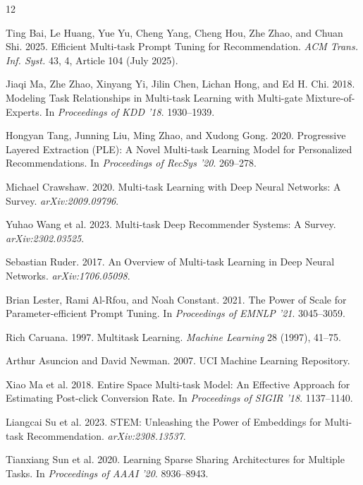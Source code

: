 \documentclass[sigconf,anonymous]{acmart}
\begin{document}
\begin{thebibliography}{12}

Ting Bai, Le Huang, Yue Yu, Cheng Yang, Cheng Hou, Zhe Zhao, and Chuan Shi.
2025. Efficient Multi-task Prompt Tuning for Recommendation.
\emph{ACM Trans. Inf. Syst.} 43, 4, Article 104 (July 2025).

Jiaqi Ma, Zhe Zhao, Xinyang Yi, Jilin Chen, Lichan Hong, and Ed H. Chi. 2018.
Modeling Task Relationships in Multi-task Learning with Multi-gate
Mixture-of-Experts. In \emph{Proceedings of KDD '18}. 1930--1939.

Hongyan Tang, Junning Liu, Ming Zhao, and Xudong Gong. 2020.
Progressive Layered Extraction (PLE): A Novel Multi-task Learning Model for
Personalized Recommendations. In \emph{Proceedings of RecSys '20}. 269--278.

Michael Crawshaw. 2020. Multi-task Learning with Deep Neural Networks: A Survey.
\emph{arXiv:2009.09796}.

Yuhao Wang et al. 2023. Multi-task Deep Recommender Systems: A Survey.
\emph{arXiv:2302.03525}.

Sebastian Ruder. 2017. An Overview of Multi-task Learning in Deep Neural
Networks. \emph{arXiv:1706.05098}.

Brian Lester, Rami Al-Rfou, and Noah Constant. 2021. The Power of Scale for
Parameter-efficient Prompt Tuning. In \emph{Proceedings of EMNLP '21}. 3045--3059.

Rich Caruana. 1997. Multitask Learning. \emph{Machine Learning} 28 (1997), 41--75.

Arthur Asuncion and David Newman. 2007. UCI Machine Learning Repository.

Xiao Ma et al. 2018. Entire Space Multi-task Model: An Effective Approach for
Estimating Post-click Conversion Rate. In \emph{Proceedings of SIGIR '18}. 1137--1140.

Liangcai Su et al. 2023. STEM: Unleashing the Power of Embeddings for Multi-task
Recommendation. \emph{arXiv:2308.13537}.

Tianxiang Sun et al. 2020. Learning Sparse Sharing Architectures for Multiple
Tasks. In \emph{Proceedings of AAAI '20}. 8936--8943.

\end{thebibliography}
\end{document}
